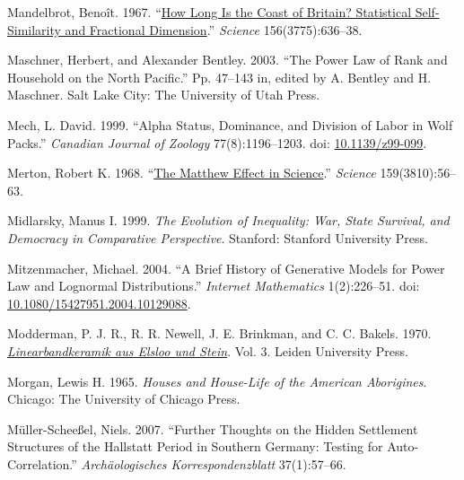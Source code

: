 \documentclass[
  12pt,
]{book}
\newlength{\cslhangindent}
\newlength{\cslentryspacingunit} %
\newenvironment{CSLReferences}[2] %
 {%
  \setlength{\parindent}{0pt}
  \ifodd #1
  \let\oldpar\par
  \def\par{\hangindent=\cslhangindent\oldpar}
  \fi
  \setlength{\parskip}{#2\cslentryspacingunit}
 }%
 {}
\begin{document}
\begin{CSLReferences}{1}{0}
\leavevmode{}%
Mandelbrot, Benoît. 1967. {``\href{https://www.jstor.org/stable/1721427}{How Long Is the Coast of Britain? Statistical Self-Similarity and Fractional Dimension}.''} \emph{Science} 156(3775):636--38.

\leavevmode{}%
Maschner, Herbert, and Alexander Bentley. 2003. {``The Power Law of Rank and Household on the North Pacific.''} Pp. 47--143 in, edited by A. Bentley and H. Maschner. Salt Lake City: The University of Utah Press.

\leavevmode{}%
Mech, L. David. 1999. {``Alpha Status, Dominance, and Division of Labor in Wolf Packs.''} \emph{Canadian Journal of Zoology} 77(8):1196--1203. doi: \href{https://doi.org/10.1139/z99-099}{10.1139/z99-099}.

\leavevmode{}%
Merton, Robert K. 1968. {``\href{https://www.jstor.org/stable/1723414}{The Matthew Effect in Science}.''} \emph{Science} 159(3810):56--63.

\leavevmode{}%
Midlarsky, Manus I. 1999. \emph{The Evolution of Inequality: War, State Survival, and Democracy in Comparative Perspective}. Stanford: Stanford University Press.

\leavevmode{}%
Mitzenmacher, Michael. 2004. {``A Brief History of Generative Models for Power Law and Lognormal Distributions.''} \emph{Internet Mathematics} 1(2):226--51. doi: \href{https://doi.org/10.1080/15427951.2004.10129088}{10.1080/15427951.2004.10129088}.

\leavevmode{}%
Modderman, P. J. R., R. R. Newell, J. E. Brinkman, and C. C. Bakels. 1970. \emph{\href{http://hdl.handle.net/1887/2720923}{Linearbandkeramik aus Elsloo und Stein}}. Vol. 3. Leiden University Press.

\leavevmode{}%
Morgan, Lewis H. 1965. \emph{Houses and House-Life of the American Aborigines}. Chicago: The University of Chicago Press.

\leavevmode{}%
Müller-Scheeßel, Niels. 2007. {``Further Thoughts on the Hidden Settlement Structures of the Hallstatt Period in Southern Germany: Testing for Auto-Correlation.''} \emph{Archäologisches Korrespondenzblatt} 37(1):57--66.


\end{CSLReferences}
\end{document}
